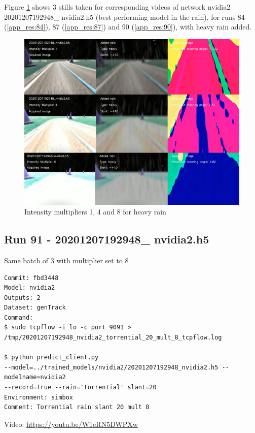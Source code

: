 Figure \ref{fig:20201207192948_nvidia2_mult_1_4_8_heavy} shows 3 stills taken for corresponding videos of network nvidia2 20201207192948\_ nvidia2.h5 (best performing model in the rain), for runs 84 (\ref{app_res:84}), 87 (\ref{app_res:87}) and 90 (\ref{app_res:90}), with heavy rain added.

\begin{figure}[ht]
 \centering 
 \includegraphics[width=\textwidth]{Figures/20201207192948_nvidia2_mult_1_4_8_heavy.png}
 \caption{Intensity multipliers 1, 4 and 8 for heavy rain}
 \label{fig:20201207192948_nvidia2_mult_1_4_8_heavy}
\end{figure}

\subsection{Run 91 - 20201207192948\_ nvidia2.h5 }
Same batch of 3 with multiplier set to 8
\label{app_res:91}
\begin{verbatim}
Commit: fbd3448
Model: nvidia2 
Outputs: 2
Dataset: genTrack
Command:
$ sudo tcpflow -i lo -c port 9091 > 
/tmp/20201207192948_nvidia2_torrential_20_mult_8_tcpflow.log

$ python predict_client.py
--model=../trained_models/nvidia2/20201207192948_nvidia2.h5 --modelname=nvidia2 
--record=True --rain='torrential' slant=20
Environment: simbox
Comment: Torrential rain slant 20 mult 8
\end{verbatim}
Video: \url{https://youtu.be/W1eRN5DWPXw}

